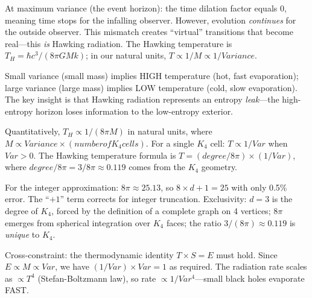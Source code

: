 \documentclass[11pt,a4paper]{book}
\def\text#1{#1}%
\begin{document}
At maximum variance (the event horizon): the time dilation factor equals 0, meaning time stops for the infalling observer. However, evolution \emph{continues} for the outside observer. This mismatch creates ``virtual'' transitions that become real---this \emph{is} Hawking radiation. The Hawking temperature is $T_H = \hbar c^3 / (8\pi G M k)$; in our natural units, $T \propto 1/M \propto 1/\text{Variance}$.

Small variance (small mass) implies HIGH temperature (hot, fast evaporation); large variance (large mass) implies LOW temperature (cold, slow evaporation). The key insight is that Hawking radiation represents an entropy \emph{leak}---the high-entropy horizon loses information to the low-entropy exterior.

Quantitatively, $T_H \propto 1/(8\pi M)$ in natural units, where $M \propto \text{Variance} \times (\text{number of } K_4 \text{ cells})$. For a single $K_4$ cell: $T \propto 1/\text{Var}$ when $\text{Var} > 0$. The Hawking temperature formula is $T = (\text{degree}/8\pi) \times (1/\text{Var})$, where $\text{degree}/8\pi = 3/8\pi \approx 0.119$ comes from the $K_4$ geometry.

For the integer approximation: $8\pi \approx 25.13$, so $8 \times d + 1 = 25$ with only 0.5\% error. The ``$+1$'' term corrects for integer truncation. Exclusivity: $d = 3$ is the degree of $K_4$, forced by the definition of a complete graph on 4 vertices; $8\pi$ emerges from spherical integration over $K_4$ faces; the ratio $3/(8\pi) \approx 0.119$ is \emph{unique} to $K_4$.

Cross-constraint: the thermodynamic identity $T \times S = E$ must hold. Since $E \propto M \propto \text{Var}$, we have $(1/\text{Var}) \times \text{Var} = 1$ as required. The radiation rate scales as $\propto T^4$ (Stefan-Boltzmann law), so rate $\propto 1/\text{Var}^4$---small black holes evaporate FAST.
\end{document}
